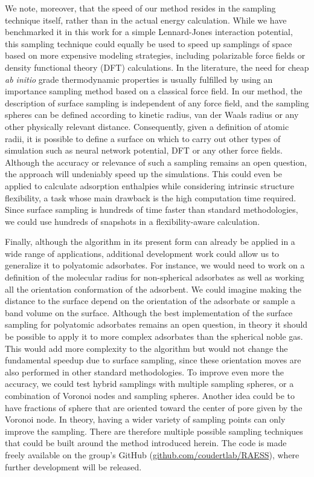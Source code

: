 \documentclass[main]{subfiles}
\begin{document}
We note, moreover, that the speed of our method resides in the sampling technique itself, rather than in the actual energy calculation. While we have benchmarked it in this work for a simple Lennard-Jones interaction potential, this sampling technique could equally be used to speed up samplings of space based on more expensive modeling strategies, including polarizable force fields or density functional theory (DFT) calculations. In the literature, the need for cheap \emph{ab initio} grade thermodynamic properties is usually fulfilled by using an importance sampling method based on a classical force field.\cite{Vandenbrande2018} In our method, the description of surface sampling is independent of any force field, and the sampling spheres can be defined according to kinetic radius, van der Waals radius or any other physically relevant distance. {Consequently, given a definition of atomic radii, it is possible to define a surface on which to carry out other types of simulation such as neural network potential, DFT or any other force fields. Although the accuracy or relevance of such a sampling remains an open question, the approach will undeniably speed up the simulations.} This could even be applied to calculate adsorption enthalpies while considering intrinsic structure flexibility,\cite{Witman_2017} a task whose main drawback is the high computation time required. Since surface sampling is hundreds of time faster than standard methodologies, we could use hundreds of snapshots in a flexibility-aware calculation.

Finally, although the algorithm in its present form can already be applied in a wide range of applications, additional development work could allow us to generalize it to polyatomic adsorbates. For instance, we would need to {work on a definition of the molecular radius for non-spherical adsorbates as well as working} all the orientation conformation of the adsorbent. {We could imagine making the distance to the surface depend on the orientation of the adsorbate or sample a band volume on the surface. Although the best implementation of the surface sampling for polyatomic adsorbates remains an open question, in theory it should be possible to apply it to more complex adsorbates than the spherical noble gas. } This would add more complexity to the algorithm but would not change the fundamental speedup due to surface sampling, since these orientation moves are also performed in other standard methodologies. To improve even more the accuracy, we could test hybrid samplings with multiple sampling spheres, or a combination of Voronoi nodes and sampling spheres. Another idea could be to have fractions of sphere that are oriented toward the center of pore given by the Voronoi node. In theory, having a wider variety of sampling points can only improve the sampling. There are therefore multiple possible sampling techniques that could be built around the method introduced herein. {The code is made freely available on the group's GitHub (\url{github.com/coudertlab/RAESS}), where further development will be released.}
\end{document}
